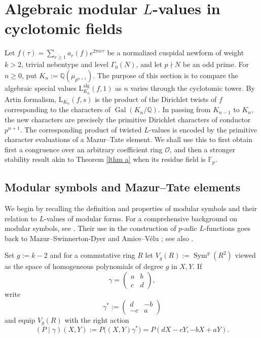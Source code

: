 \documentclass[11pt,table]{amsart}
\newcommand{\Gal}{\op{Gal}}
\newcommand{\Q}{\mathbb{Q}}
\newcommand{\F}{\mathbb{F}}
\newcommand{\op}[1]{\operatorname{#1}}
\numberwithin{equation}{section}
\begin{document}
\section{Algebraic modular \(L\)-values in cyclotomic fields}
\label{sec:Mazur-Tate}

\par Let $f(\tau)
        =
        \sum_{r\geq1}a_r(f)e^{2\pi i r\tau}$ be a normalized cuspidal newform of weight \(k>2\), trivial
nebentype and level \(\Gamma_0(N)\), and let \(p\nmid N\) be an odd
prime.  For \(n\geq0\), put $K_n:=\Q(\mu_{p^{n+1}})$. The purpose of this section is to compare the algebraic special values $\mathrm{L}_{K_n}^{\operatorname{alg}}(f,1)$ as \(n\) varies through the cyclotomic tower. By Artin formalism, \(\mathrm{L}_{K_n}(f,s)\) is the product of the Dirichlet
twists of \(f\) corresponding to the characters of
\(\Gal(K_n/\Q)\).  In passing from \(K_{n-1}\) to \(K_n\), the new
characters are precisely the primitive Dirichlet characters of
conductor \(p^{n+1}\).  The corresponding product of twisted
\(L\)-values is encoded by the primitive character evaluations of a
Mazur--Tate element.  We shall use this to first obtain first a congruence
over an arbitrary coefficient ring \(\mathcal O\), and then a stronger
stability result akin to Theorem \ref{lthm a} when its residue field is \(\F_p\).

\subsection{Modular symbols and Mazur--Tate elements}

\par We begin by recalling the definition and properties of modular symbols and their relation to $L$-values of modular forms. For a comprehensive background on modular symbols, see
\cite{Manin1973,AshStevens,PollackWeston}.  Their use in the
construction of \(p\)-adic \(L\)-functions goes back to
Mazur--Swinnerton-Dyer and Amice--V\'elu
\cite{MazurSwinnertonDyer,AmiceVelu}; see also
\cite{PollackStevens}.

\par Set $g:=k-2$ and for a commutative ring \(R\) let $V_g(R):=\operatorname{Sym}^g(R^2)$ viewed as the space of homogeneous polynomials of degree \(g\) in
\(X,Y\).  If
\[
        \gamma=
        \begin{pmatrix}
        a&b\\ c&d
        \end{pmatrix},
\]
write
\[
        \gamma^*
        :=
        \begin{pmatrix}
        d&-b\\ -c&a
        \end{pmatrix}
\]
and equip \(V_g(R)\) with the right action
\[
        (P\mid\gamma)(X,Y)
        :=
        P\bigl((X,Y)\gamma^*\bigr)
        =
        P(dX-cY,-bX+aY).
\]
\end{document}
